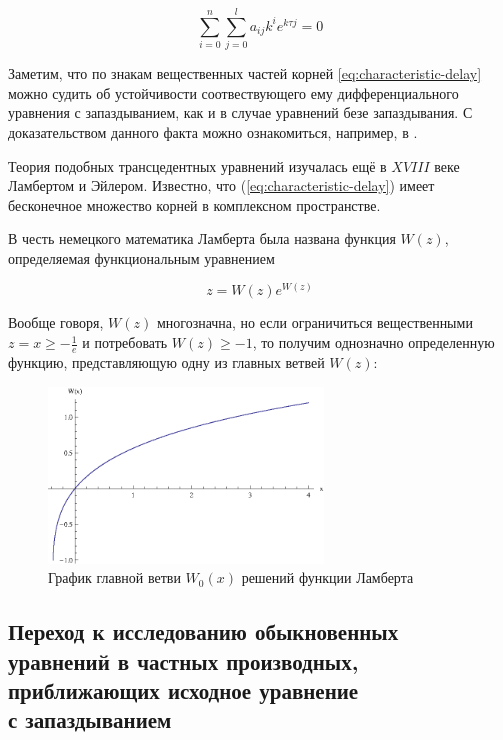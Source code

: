 \begin{equation}\label{eq:characteristic-delay}
\sum\limits_{i=0}^{n} \sum\limits_{j=0}^{l} a_{ij} k^i e^{k \tau j} = 0
\end{equation}

Заметим, что по знакам вещественных частей корней \ref{eq:characteristic-delay} можно судить об устойчивости соотвествующего ему дифференциального уравнения с запаздыванием, как и в случае уравнений безе запаздывания. С доказательством данного факта можно ознакомиться, например, в \cite{bib:Elsgoltz-Norkin}.

Теория подобных трансцедентных уравнений изучалась ещё в $XVIII$ веке Ламбертом и Эйлером. Известно, что (\ref{eq:characteristic-delay}) имеет бесконечное множество корней в комплексном пространстве.

В честь немецкого математика Ламберта была названа функция $W(z)$, определяемая функциональным уравнением

\begin{equation}
z = W(z) e^{W(z)}
\end{equation}

Вообще говоря, $W(z)$ многозначна, но если ограничиться вещественными $z = x \geq -\frac{1}{e}$ и потребовать $W(z) \geq -1$, то получим однозначно определенную функцию, представляющую одну из главных ветвей $W(z)$:

\begin{figure}
\begin{center}
\includegraphics[width=0.65\textwidth]{./1_modelling/Lambert.eps}
\end{center}
\caption{График главной ветви $W_0(x)$ решений функции Ламберта}
\end{figure}

\subsection{Переход к исследованию обыкновенных\\уравнений в частных производных,\\приближающих исходное уравнение\\с запаздыванием}

